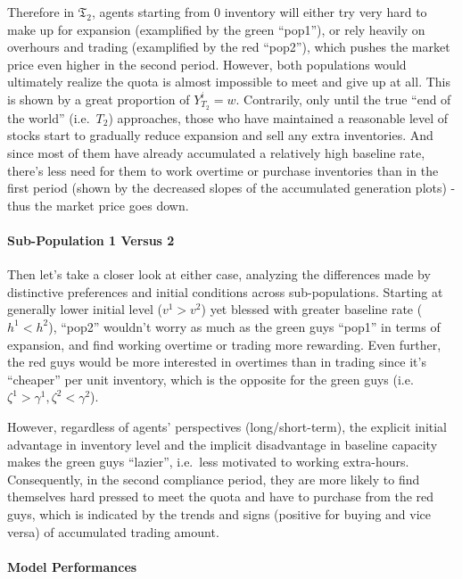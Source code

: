 \documentclass[a4paper,10pt]{article}
\newcommand{\1}{\mathbf{1}}
\begin{document}
Therefore in \(\mathfrak{T}_2\), agents starting from 0
inventory will either try very hard to make up for expansion
(examplified by the green ``pop1''), or rely heavily on overhours and
trading (examplified by the red ``pop2''), which pushes the market price
even higher in the second period. However, both populations would
ultimately realize the quota is almost impossible to meet and give up at
all. This is shown by a great proportion of \(Y_{T_2}^i=w\). Contrarily,
only until the true ``end of the world'' (i.e.~\(T_2\)) approaches,
those who have maintained a reasonable level of stocks start to
gradually reduce expansion and sell any extra inventories. And since
most of them have already accumulated a relatively high baseline rate,
there's less need for them to work overtime or purchase inventories than
in the first period (shown by the decreased slopes of the accumulated
generation plots) - thus the market price goes down.

\paragraph{Sub-Population 1 Versus 2}

Then let's take a closer look at either case, analyzing the differences
made by distinctive preferences and initial conditions across
sub-populations. Starting at generally lower initial level (\(v^1>v^2\))
yet blessed with greater baseline rate (\(h^1<h^2\)), ``pop2'' wouldn't
worry as much as the green guys ``pop1'' in terms of expansion, and find
working overtime or trading more rewarding. Even further, the red guys
would be more interested in overtimes than in trading since it's
``cheaper'' per unit inventory, which is the opposite for the green guys
(i.e.~\(\zeta^1>\gamma^1, \zeta^2<\gamma^2\)).

However, regardless of agents' perspectives (long/short-term), the
explicit initial advantage in inventory level and the implicit
disadvantage in baseline capacity makes the green guys ``lazier'',
i.e.~less motivated to working extra-hours. Consequently, in the second
compliance period, they are more likely to find themselves hard pressed
to meet the quota and have to purchase from the red guys, which is
indicated by the trends and signs (positive for buying and vice versa)
of accumulated trading amount.

\paragraph{Model Performances}
\end{document}
